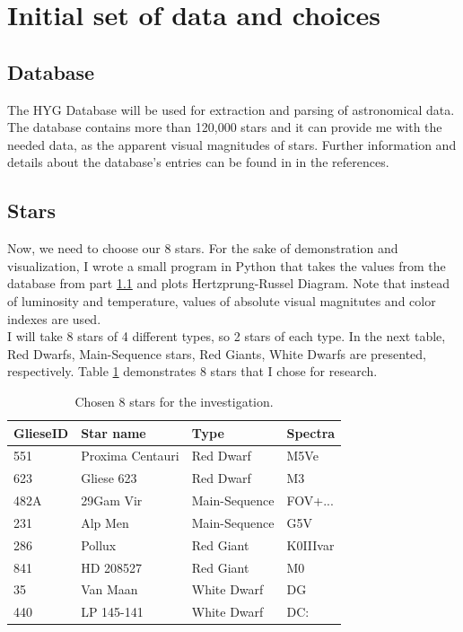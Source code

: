 \documentclass{article}
\begin{document}
\section{Initial set of data and choices}

  \subsection{Database}
  \label{database}
  The HYG Database \cite{hyg} will be used for extraction and parsing of astronomical data. The database contains more than 120,000 stars and it can provide me with the needed data, as the apparent visual magnitudes of stars. Further information and details about the database's entries can be found in in the references.\\  
  
  \subsection{Stars}
  
  Now, we need to choose our 8 stars. For the sake of demonstration and visualization, I wrote a small program in Python that takes the values from the database from part \ref{database} and plots Hertzprung-Russel Diagram. Note that instead of luminosity and temperature, values of absolute visual magnitutes and color indexes are used.\\
  
  I will take 8 stars of 4 different types, so 2 stars of each type. In the next table, Red Dwarfs, Main-Sequence stars, Red Giants, White Dwarfs are presented, respectively. Table \ref{stars} demonstrates 8 stars that I chose for research.\\
  
  \begin{table}[h!]
    \begin{center}
      \caption{Chosen 8 stars for the investigation.}
      \begin{tabular}{l | l | l | l}
        \textbf{GlieseID} & \textbf{Star name} & \textbf{Type} & \textbf{Spectra}\\
        \hline
        551  & Proxima Centauri & Red Dwarf     & M5Ve\\
        623  & Gliese 623       & Red Dwarf     & M3\\
        482A & 29Gam Vir        & Main-Sequence & FOV+...\\
        231  & Alp Men          & Main-Sequence & G5V\\
        286  & Pollux           & Red Giant     & K0IIIvar\\
        841  & HD 208527        & Red Giant     & M0\\
        35   & Van Maan         & White Dwarf   & DG\\
        440  & LP 145-141       & White Dwarf   & DC:\\
      \end{tabular}
      \label{stars}
    \end{center}
  \end{table}
  
\end{document}

